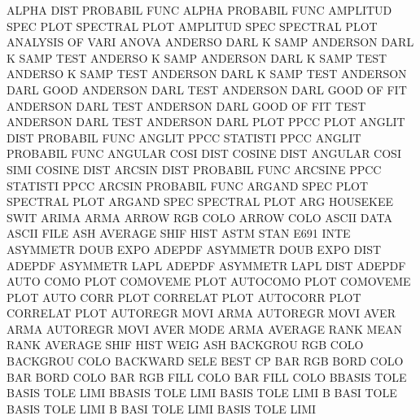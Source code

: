 ALPHA    DIST                           PROBABIL FUNC
ALPHA                                   PROBABIL FUNC
AMPLITUD SPEC PLOT                      SPECTRAL PLOT
AMPLITUD SPEC                           SPECTRAL PLOT
ANALYSIS OF   VARI                      ANOVA
ANDERSO  DARL K    SAMP                 ANDERSON DARL K    SAMP TEST
ANDERSO  K    SAMP                      ANDERSON DARL K    SAMP TEST
ANDERSO  K    SAMP TEST                 ANDERSON DARL K    SAMP TEST
ANDERSON DARL GOOD                      ANDERSON DARL TEST
ANDERSON DARL GOOD OF   FIT             ANDERSON DARL TEST
ANDERSON DARL GOOD OF   FIT  TEST       ANDERSON DARL TEST
ANDERSON DARL PLOT                      PPCC     PLOT
ANGLIT   DIST                           PROBABIL FUNC
ANGLIT   PPCC                           STATISTI PPCC
ANGLIT                                  PROBABIL FUNC
ANGULAR  COSI DIST                      COSINE   DIST
ANGULAR  COSI SIMI                      COSINE   DIST
ARCSIN   DIST                           PROBABIL FUNC
ARCSINE  PPCC                           STATISTI PPCC
ARCSIN                                  PROBABIL FUNC
ARGAND   SPEC PLOT                      SPECTRAL PLOT
ARGAND   SPEC                           SPECTRAL PLOT
ARG                                     HOUSEKEE SWIT
ARIMA                                   ARMA
ARROW    RGB  COLO                      ARROW    COLO
ASCII    DATA                           ASCII    FILE
ASH                                     AVERAGE  SHIF HIST
ASTM     STAN                           E691     INTE
ASYMMETR DOUB EXPO                      ADEPDF
ASYMMETR DOUB EXPO DIST                 ADEPDF
ASYMMETR LAPL                           ADEPDF
ASYMMETR LAPL DIST                      ADEPDF
AUTO     COMO PLOT                      COMOVEME PLOT
AUTOCOMO PLOT                           COMOVEME PLOT
AUTO     CORR PLOT                      CORRELAT PLOT
AUTOCORR PLOT                           CORRELAT PLOT
AUTOREGR MOVI                           ARMA
AUTOREGR MOVI AVER                      ARMA
AUTOREGR MOVI AVER MODE                 ARMA
AVERAGE  RANK                           MEAN     RANK
AVERAGE  SHIF HIST WEIG                 ASH
BACKGROU RGB  COLO                      BACKGROU COLO
BACKWARD SELE                           BEST     CP
BAR      RGB  BORD COLO                 BAR      BORD COLO
BAR      RGB  FILL COLO                 BAR      FILL COLO
BBASIS   TOLE                           BASIS    TOLE LIMI
BBASIS   TOLE LIMI                      BASIS    TOLE LIMI
B        BASI TOLE                      BASIS    TOLE LIMI
B        BASI TOLE LIMI                 BASIS    TOLE LIMI
